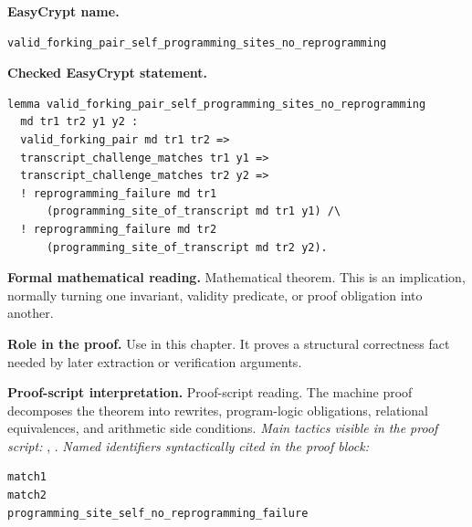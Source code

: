 \begin{formaltheorem}
\noindent\textbf{EasyCrypt name.}
\begin{lstlisting}[language=EasyCrypt,basicstyle=\ttfamily\scriptsize]
valid_forking_pair_self_programming_sites_no_reprogramming
\end{lstlisting}
\noindent\textbf{Checked EasyCrypt statement.}
\begin{lstlisting}[language=EasyCrypt,basicstyle=\ttfamily\scriptsize]
lemma valid_forking_pair_self_programming_sites_no_reprogramming
  md tr1 tr2 y1 y2 :
  valid_forking_pair md tr1 tr2 =>
  transcript_challenge_matches tr1 y1 =>
  transcript_challenge_matches tr2 y2 =>
  ! reprogramming_failure md tr1
      (programming_site_of_transcript md tr1 y1) /\
  ! reprogramming_failure md tr2
      (programming_site_of_transcript md tr2 y2).
\end{lstlisting}
\noindent\textbf{Formal mathematical reading.}
Mathematical theorem. This is an implication, normally turning one invariant, validity predicate, or proof obligation into another.

\noindent\textbf{Role in the proof.}
Use in this chapter. It proves a structural correctness fact needed by later extraction or verification arguments.

\noindent\textbf{Proof-script interpretation.}
Proof-script reading. The machine proof decomposes the theorem into rewrites, program-logic obligations, relational equivalences, and arithmetic side conditions.
\emph{Main tactics visible in the proof script:} \ec{split}, \ec{apply}.
\emph{Named identifiers syntactically cited in the proof block:}
\begin{lstlisting}[language=EasyCrypt,basicstyle=\ttfamily\scriptsize]
match1
match2
programming_site_self_no_reprogramming_failure
\end{lstlisting}

\end{formaltheorem}

